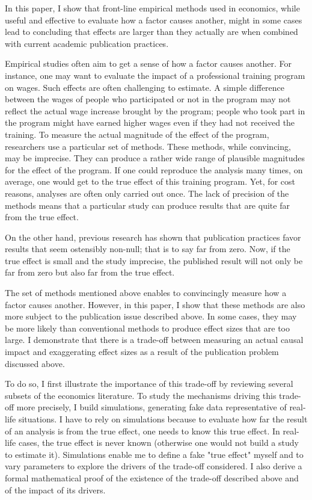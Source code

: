 In this paper, I show that front-line empirical methods used in economics, while useful and effective to evaluate how a factor causes another, might in some cases lead to concluding that effects are larger than they actually are when combined with current academic publication practices.\newline

Empirical studies often aim to get a sense of how a factor causes another. For instance, one may want to evaluate the impact of a professional training program on wages. Such effects are often challenging to estimate. A simple difference between the wages of people who participated or not in the program may not reflect the actual wage increase brought by the program; people who took part in the program might have earned higher wages even if they had not received the training. To measure the actual magnitude of the effect of the program, researchers use a particular set of methods. These methods, while convincing, may be imprecise. They can produce a rather wide range of plausible magnitudes for the effect of the program. If one could reproduce the analysis many times, on average, one would get to the true effect of this training program. Yet, for cost reasons, analyses are often only carried out once. The lack of precision of the methods means that a particular study can produce results that are quite far from the true effect.

On the other hand, previous research has shown that publication practices favor results that seem ostensibly non-null; that is to say far from zero. Now, if the true effect is small and the study imprecise, the published result will not only be far from zero but also far from the true effect. 

The set of methods mentioned above enables to convincingly measure how a factor causes another. However, in this paper, I show that these methods are also more subject to the publication issue described above. In some cases, they may be more likely than conventional methods to produce effect sizes that are too large. I demonstrate that there is a trade-off between measuring an actual causal impact and exaggerating effect sizes as a result of the publication problem discussed above.

To do so, I first illustrate the importance of this trade-off by reviewing several subsets of the economics literature. To study the mechanisms driving this trade-off more precisely, I build simulations, generating fake data representative of real-life situations. I have to rely on simulations because to evaluate how far the result of an analysis is from the true effect, one needs to know this true effect. In real-life cases, the true effect is never known (otherwise one would not build a study to estimate it). Simulations enable me to define a fake "true effect" myself and to vary parameters to explore the drivers of the trade-off considered. I also derive a formal mathematical proof of the existence of the trade-off described above and of the impact of its drivers.

